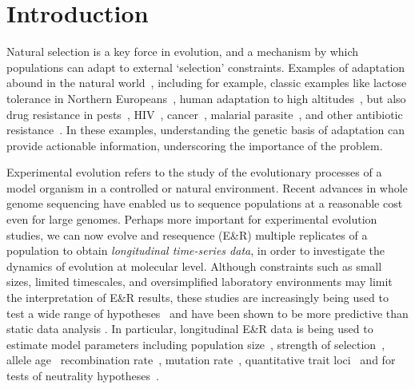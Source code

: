 \section{Introduction}
Natural selection is a key force in evolution, and a mechanism by
which populations can adapt to external `selection'
constraints. Examples of adaptation abound in the natural 
world~\cite{going2016fan},
including for example, classic examples like lactose tolerance in
Northern Europeans~\cite{bersaglieri2004genetic}, human adaptation to
high altitudes~\cite{yi2010sequencing,simonson2010genetic}, but also
drug resistance in pests~\cite{daborn2001ddt},
HIV~\cite{Feder2016More},
cancer~\cite{gottesman2002mechanisms,zahreddine2013mechanisms},
malarial parasite~\cite{ariey2014molecular,nair2007recurrent}, and
other antibiotic resistance~\cite{spellberg2008epidemic}. In these
examples, understanding the genetic basis of adaptation can provide
actionable information, underscoring the importance of the problem.

Experimental evolution refers to the study of the evolutionary
processes of a model organism in a controlled
\cite{hegreness2006equivalence,lang2013pervasive,orozco2012adaptation,
  lang2011genetic,barrick2009genome,bollback2007clonal,oz2014strength}
or natural
\cite{maldarelli2013hiv,reid2011new,denef2012situ,winters2012development,
  daniels2013genetic,barrett2008natural,bergland2014genomic}
environment. Recent advances in whole genome sequencing have enabled
us to sequence populations at a reasonable cost even for large
genomes. Perhaps more important for experimental evolution studies, we
can now evolve and resequence (E\&R) multiple replicates of a population to
obtain \emph{longitudinal time-series data}, in order to investigate
the dynamics of evolution at molecular level.  Although constraints
such as small sizes, limited timescales, and oversimplified
laboratory environments may limit the interpretation of E\&R results,
these studies are increasingly being used to test a wide range of
hypotheses~\cite{kawecki2012experimental} and have been shown to be
more predictive than static data analysis
\cite{boyko2008assessing,desai2008polymorphism,sawyer1992population}.
In particular, longitudinal E\&R data is being used to estimate model
parameters including population
size~\cite{williamson1999using,wang2001pseudo,pollak1983new,waples1989generalized,
  Terhorst2015Multi, jonas2016estimating}, strength of
selection~\cite{mathieson2013estimating,illingworth2011distinguishing,Terhorst2015Multi,
  bollback2008estimation,illingworth2012quantifying,malaspinas2012estimating,
  steinrucken2014novel}, allele age~\cite{malaspinas2012estimating}
recombination rate~\cite{Terhorst2015Multi}, mutation
rate~\cite{Barrick2013Genome, Terhorst2015Multi}, quantitative trait
loci~\cite{baldwin2014power} and for tests of neutrality
hypotheses~\cite{feder2014Identifying,Terhorst2015Multi,burke2010genome,bergland2014genomic}.

